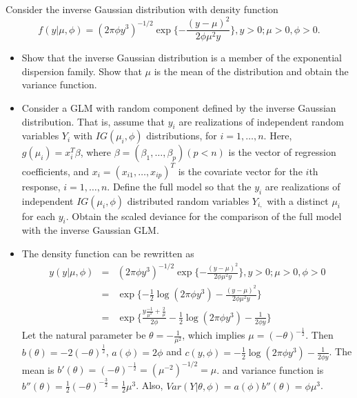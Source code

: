 \documentclass[]{article}
\begin{document}
\begin{enumerate}
{        \item[Ex 3] Consider the inverse Gaussian distribution with density function
        $$f(y|\mu,\phi) = (2\pi\phi y^3)^{-1/2}\exp\{-\frac{(y-\mu)^2}{2\phi\mu^2 y}\}, y>0; \mu>0,\phi>0.$$
        \begin{itemize}
        	\item[(a)] Show that the inverse Gaussian distribution is a member of the exponential dispersion family. Show that $\mu$ is the mean of the distribution and obtain the variance function.
        	\item[(b)] Consider a GLM with random component defined by the inverse Gaussian distribution. That is, assume that $y_i$ are realizations of independent random variables $Y_i$ with $IG(\mu_i,\phi)$ distributions, for $i = 1,\ldots,n$. Here, $g(\mu_i) = x_i^T\beta$, where $\beta = (\beta_1,\ldots,\beta_p)(p<n)$ is the vector of regression coefficients, and $x_i = (x_{i1},\ldots,x_{ip})^T$ is the covariate vector for the $i$th response, $i = 1,\ldots,n$. Define the full model so that the $y_i$ are realizations of independent $IG(\mu_i,\phi)$ distributed random variables $Y_{i,}$ with a distinct $\mu_i$ for each $y_i$. Obtain the scaled deviance for the comparison of the full model with the inverse Gaussian GLM.
        \end{itemize}
        \item[Sol 3]
        \begin{itemize}
        	\item[(a)]
        	The density function can be rewritten as
        	\begin{eqnarray}
        	y(y|\mu, \phi) & = & (2\pi\phi y^3)^{-1/2}\exp\{-\frac{(y-\mu)^2}{2\phi\mu^2y}\},y>0;\mu>0,\phi>0\\
        	& = & \exp\{-\frac{1}{2}\log(2\pi\phi y^3)-\frac{(y-\mu)^2}{2\phi\mu^2 y}\}\\
        	& = & \exp\{\frac{y\frac{-1}{\mu^2} + \frac{2}{\mu}}{2\phi}-\frac{1}{2}\log(2\pi\phi y^3)-\frac{1}{2\phi y}\}
        	\end{eqnarray}
        	Let the natural parameter be $\theta = -\frac{1}{\mu^2}$, which implies $\mu = (-\theta)^{-\frac{1}{2}}$. Then $b(\theta) = -2(-\theta)^{\frac{1}{2}}$, $a(\phi) = 2\phi$ and $c(y,\phi) = -\frac{1}{2}\log(2\pi\phi y^3)-\frac{1}{2\phi y}$.
        	The mean is $b'(\theta) = (-\theta)^{-\frac{1}{2}} = (\mu^{-2})^{-1/2} = \mu$. and variance function is $b''(\theta) = \frac{1}{2}(-\theta)^{-\frac{3}{2}} = \frac{1}{2}\mu^3$.
        	Also, $Var(Y|\theta,\phi) = a(\phi)b''(\theta) = \phi\mu^3$.

\end{itemize}}
\end{enumerate}
\end{document}
